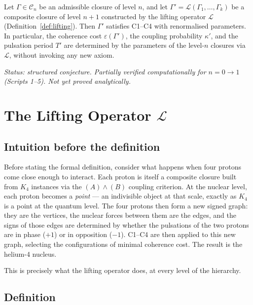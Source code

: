 \documentclass[12pt,a4paper]{article}
\theoremstyle{plain}
\theoremstyle{definition}
\theoremstyle{remark}
\newenvironment{conjecturebox}[1][]{%
  \begin{tcolorbox}[conjecturestyle,title={Conjecture\ifx\relax#1\relax\else: #1\fi}]}{\end{tcolorbox}}
\newcommand{\Kfour}{K_4}
\newcommand{\Calg}{\mathcal{C}}
\newcommand{\Lop}{\mathcal{L}}
\newcommand{\eps}{\varepsilon}
\begin{document}
\begin{conjecturebox}[Scale-invariance of C1--C4]
Let $\Gamma \in \Calg_n$ be an admissible closure of level $n$, and let
$\Gamma' = \Lop(\Gamma_1, \ldots, \Gamma_k)$ be a composite closure of level $n+1$
constructed by the lifting operator $\Lop$ (Definition~\ref{def:lifting}). Then
$\Gamma'$ satisfies C1--C4 with renormalised parameters. In particular, the
coherence cost $\eps(\Gamma')$, the coupling probability $\kappa'$, and the pulsation
period $T'$ are determined by the parameters of the level-$n$ closures via
$\Lop$, without invoking any new axiom.
\end{conjecturebox}

\emph{Status: structured conjecture. Partially verified computationally for $n = 0
\to 1$ (Scripts 1--5). Not yet proved analytically.}

\section{The Lifting Operator \texorpdfstring{$\Lop$}{L}}
\label{sec:lifting}

\subsection{Intuition before the definition}

Before stating the formal definition, consider what happens when four protons come
close enough to interact. Each proton is itself a composite closure built from $\Kfour$
instances via the $(A)\wedge(B)$ coupling criterion. At the nuclear level, each proton
becomes a \emph{point} --- an indivisible object at that scale, exactly as $\Kfour$
is a point at the quantum level. The four protons then form a new signed graph: they
are the vertices, the nuclear forces between them are the edges, and the signs of
those edges are determined by whether the pulsations of the two protons are in phase
($+1$) or in opposition ($-1$). C1--C4 are then applied to this new graph, selecting
the configurations of minimal coherence cost. The result is the helium-4 nucleus.

This is precisely what the lifting operator does, at every level of the hierarchy.

\subsection{Definition}
\end{document}
